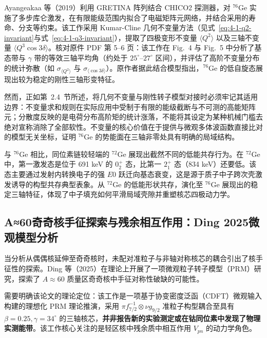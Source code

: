 Ayangeakaa 等（2019）\cite{ayangeakaa-2019-rigid-triaxial-ge76}利用 GRETINA 阵列结合 CHICO2 探测器，对 $^{76}\mathrm{Ge}$ 实施了多步库仑激发，在有限能级范围内拟合了电磁矩阵元网络，并结合采用的寿命、分支等约束。该工作采用 Kumar-Cline 几何不变量方法（见式~\eqref{eq:4-1-q2-invariant}与式~\eqref{eq:4-1-q3-invariant}），提取了四极变形不变量 $\langle Q^2 \rangle$ 以及三轴不变量 $\langle Q^3 \cos 3\delta \rangle$。核对原件 PDF 第 5–6 页：该工作在 Fig.~4 与 Fig.~5 中分析了基态带与 $\gamma$ 带的等效三轴平均角（约处于 $25^\circ\text{--}27^\circ$ 区间），并评估了高阶不变量分布的统计弥散（如 $\sigma_{\langle Q^2 \rangle}$ 与 $\sigma_{\langle \cos 3\delta \rangle}$）。原作者据此结合模型指出，$^{76}\mathrm{Ge}$ 的低自旋态展现出较为稳定的刚性三轴形变特征。

然而，正如第~2.4~节所述，将几何不变量与刚性转子模型对接时必须牢记其适用边界：不变量求和规则在实际应用中受制于有限的能级截断与不可测的高能矩阵元；分散度反映的是电荷分布高阶矩的统计涨落，不能将其设定为某种机械门槛去绝对宣称消除了全部软性。不变量的核心价值在于提供与微观多体波函数直接比对的模型无关坐标，证明 $^{76}\mathrm{Ge}$ 的势能面在三轴非零处具有明确的局域结构。

与 $^{76}\mathrm{Ge}$ 相比，同位素链较轻端的 $^{72}\mathrm{Ge}$ 展现出截然不同的低能共存行为。在 $^{72}\mathrm{Ge}$ 中，第一激发态是位于 691 keV 的 $0^+_2$ 态，比第一 $2^+_1$ 态（834 keV）还要低。该态主要通过发射内转换电子的强 $E0$ 跃迁向基态衰变，这是源于质子中子跨次壳激发诱导的构型共存典型表象。从 $^{72}\mathrm{Ge}$ 的低能形状共存，演化至 $^{76}\mathrm{Ge}$ 展现出的稳定三轴特征，体现了中子填充如何平滑局域壳隙并重塑核芯四极动力学。

\subsection{A≈60奇奇核手征探索与残余相互作用：Ding 2025微观模型分析}\label{sec:4-2-5}

当分析从偶偶核延伸至奇奇核时，未配对准粒子与非轴对称核芯的耦合引出了核手征性的探索。Ding 等（2025）\cite{ding-2025-chiral-rotation-a60-residual-interactions}在理论上开展了一项微观粒子转子模型（PRM）研究，探索了 $A\approx 60$ 质量区奇奇核中手征对称性破缺的可能性。

需要明确该论文的理论定位：该工作是一项基于协变密度泛函（CDFT）微观输入构建的理想化 PRM 理论推演，采用 $\pi f_{7/2}^{-1} \otimes \nu g_{9/2}$ 准粒子构型耦合至具有 $\beta=0.25, \gamma=34^\circ$ 的三轴核芯，\textbf{并非报告新的实验测定或在钴同位素中发现了物理实测能带}。该工作核心关注的是轻区核中残余质中相互作用 $V_{pn}$ 的动力学角色。

